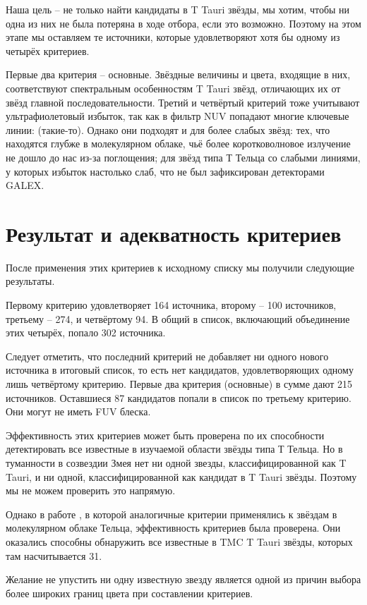 Наша цель -- не только найти кандидаты в T Tauri звёзды, мы хотим, чтобы ни одна из них не была потеряна в ходе отбора, если это возможно. Поэтому на этом этапе мы оставляем те источники, которые удовлетворяют хотя бы одному из четырёх критериев.

Первые два критерия -- основные. Звёздные величины и цвета, входящие в них, соответствуют спектральным особенностям T Tauri звёзд, отличающих их от звёзд главной последовательности. Третий и четвёртый критерий тоже учитывают ультрафиолетовый избыток, так как в фильтр NUV попадают многие ключевые линии: (такие-то). Однако они подходят и для более слабых звёзд: тех, что находятся глубже в молекулярном облаке, чьё более коротковолновое излучение не дошло до нас из-за поглощения; для звёзд типа Т Тельца со слабыми линиями, у которых избыток настолько слаб, что не был зафиксирован детекторами GALEX.

\section{Результат и адекватность критериев}
После применения этих критериев к исходному списку мы получили следующие результаты.

Первому критерию удовлетворяет 164 источника, второму -- 100 источников, третьему -- 274, и четвёртому 94. В общий в список, включающий объединение этих четырёх, попало 302 источника.

Следует отметить, что последний критерий не добавляет ни одного нового источника в итоговый список, то есть нет кандидатов, удовлетворяющих одному лишь четвёртому критерию. Первые два критерия (основные) в сумме дают 215 источников. Оставшиеся 87 кандидатов попали в список по третьему критерию. Они могут не иметь FUV блеска.

Эффективность этих критериев может быть проверена по их способности детектировать все известные в изучаемой области звёзды типа Т Тельца. Но в туманности в созвездии Змея нет ни одной звезды, классифицированной как T Tauri, и ни одной, классифицированной как кандидат в T Tauri звёзды. Поэтому мы не можем проверить это напрямую.

Однако в работе \cite{AIGdC2014galex}, в которой аналогичные критерии применялись к звёздам в молекулярном облаке Тельца, эффективность критериев была проверена. Они оказались способны обнаружить все известные в TMC T Tauri звёзды, которых там насчитывается 31. 

Желание не упустить ни одну известную  звезду является одной из причин выбора более широких границ цвета при составлении критериев.

